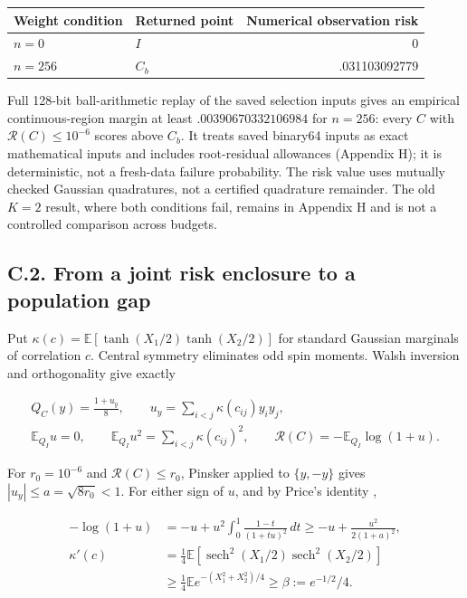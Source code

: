 \documentclass{article}
\begin{document}
\begin{longtable}[]{@{}llr@{}}
\toprule\noalign{}
Weight condition & Returned point & Numerical observation risk \\
\midrule\noalign{}
\endhead
\bottomrule\noalign{}
\endlastfoot
\(n=0\) & \(I\) & 0 \\
\(n=256\) & \(C_b\) & .031103092779 \\
\end{longtable}

Full 128-bit ball-arithmetic replay of the saved selection inputs gives
an empirical continuous-region margin at least \(.00390670332106984\)
for \(n=256\): every \(C\) with \(\mathcal R(C)\le10^{-6}\) scores above
\(C_b\). It treats saved binary64 inputs as exact mathematical inputs
and includes root-residual allowances (Appendix H); it is deterministic,
not a fresh-data failure probability. The risk value uses mutually
checked Gaussian quadratures, not a certified quadrature remainder. The
old \(K=2\) result, where both conditions fail, remains in Appendix H
and is not a controlled comparison across budgets.

\subsection*{C.2. From a joint risk enclosure to a population
gap}\label{c.2.-from-a-joint-risk-enclosure-to-a-population-gap}

Put \(\kappa(c)=\mathbb E[\tanh(X_1/2)\tanh(X_2/2)]\) for standard
Gaussian marginals of correlation \(c\). Central symmetry eliminates odd
spin moments. Walsh inversion and orthogonality give exactly

\[
\begin{gathered}
Q_C(y)=\frac{1+u_y}{8},\qquad u_y=\sum_{i<j}\kappa(c_{ij})y_iy_j,\\
\mathbb E_{Q_I}u=0,\qquad\mathbb E_{Q_I}u^2=\sum_{i<j}\kappa(c_{ij})^2,\qquad
\mathcal R(C)=-\mathbb E_{Q_I}\log(1+u).
\end{gathered}
\tag{C.2}
\]

For \(r_0=10^{-6}\) and \(\mathcal R(C)\le r_0\), Pinsker applied to
\(\{y,-y\}\) gives \(|u_y|\le a=\sqrt{8r_0}<1\). For either sign of
\(u\), and by Price's identity \citep{price1958},

\[
\begin{aligned}
-\log(1+u)&=-u+u^2\int_0^1\frac{1-t}{(1+tu)^2}\,dt
\ge-u+\frac{u^2}{2(1+a)^2},\\
\kappa'(c)&=\tfrac14\mathbb E[\operatorname{sech}^2(X_1/2)\operatorname{sech}^2(X_2/2)]\\
&\ge\tfrac14\mathbb E e^{-(X_1^2+X_2^2)/4}\ge\beta:=e^{-1/2}/4.
\end{aligned}
\tag{C.3}
\]
\end{document}
